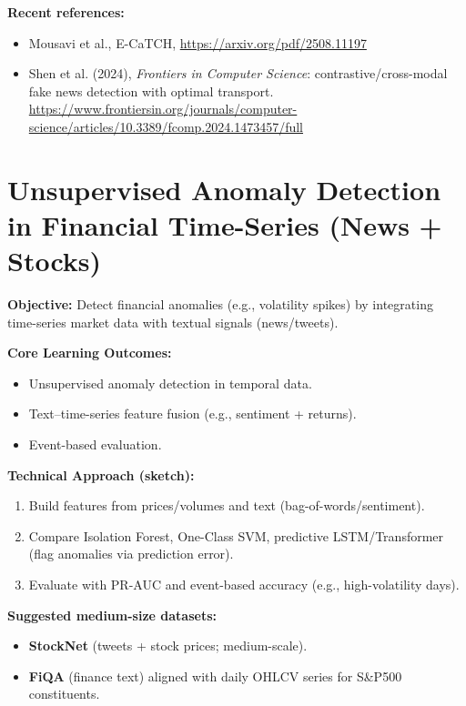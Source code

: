 \documentclass[11pt]{article}
\begin{document}
\textbf{Recent references:}
\begin{itemize}[leftmargin=2em]
  \item  Mousavi et al., E-CaTCH,
\url{https://arxiv.org/pdf/2508.11197}
  \item Shen et al. (2024), \textit{Frontiers in Computer Science}: contrastive/cross-modal fake news detection with optimal transport. \url{https://www.frontiersin.org/journals/computer-science/articles/10.3389/fcomp.2024.1473457/full}
\end{itemize}

\section{Unsupervised Anomaly Detection in Financial Time-Series (News + Stocks)}
\textbf{Objective:} Detect financial anomalies (e.g., volatility spikes) by integrating time-series market data with textual signals (news/tweets).

\textbf{Core Learning Outcomes:}
\begin{itemize}[leftmargin=2em]
  \item Unsupervised anomaly detection in temporal data.
  \item Text–time-series feature fusion (e.g., sentiment + returns).
  \item Event-based evaluation.
\end{itemize}

\textbf{Technical Approach (sketch):}
\begin{enumerate}[leftmargin=2em]
  \item Build features from prices/volumes and text (bag-of-words/sentiment).
  \item Compare Isolation Forest, One-Class SVM, predictive LSTM/Transformer (flag anomalies via prediction error).
  \item Evaluate with PR-AUC and event-based accuracy (e.g., high-volatility days).
\end{enumerate}

\textbf{Suggested medium-size datasets:}
\begin{itemize}[leftmargin=2em]
  \item \textbf{StockNet} (tweets + stock prices; medium-scale).
  \item \textbf{FiQA} (finance text) aligned with daily OHLCV series for S\&P500 constituents.
\end{itemize}


\end{document}
